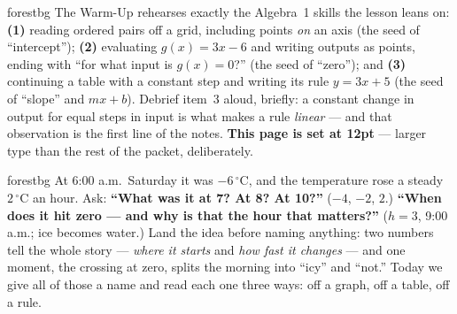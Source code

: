 \documentclass[10pt]{article}
\begin{document}
\begin{fixedskillbox}{forestbg}
    The Warm-Up rehearses exactly the Algebra~1 skills the lesson leans on: \textbf{(1)} reading
    ordered pairs off a grid, including points \emph{on} an axis (the seed of ``intercept'');
    \textbf{(2)} evaluating $g(x)=3x-6$ and writing outputs as points, ending with ``for what input is
    $g(x)=0$?'' (the seed of ``zero''); and \textbf{(3)} continuing a table with a constant step and
    writing its rule $y=3x+5$ (the seed of ``slope'' and $mx+b$). Debrief item~3 aloud, briefly: a
    constant change in output for equal steps in input is what makes a rule \emph{linear} --- and
    that observation is the first line of the notes. \textbf{This page is set at 12pt} --- larger
    type than the rest of the packet, deliberately.
\end{fixedskillbox}

\begin{skillbox}[Hook]{forestbg}
    At 6:00 a.m.\ Saturday it was $-6\,^\circ$C, and the temperature rose a steady $2\,^\circ$C an
    hour. Ask: \textbf{``What was it at 7? At 8? At 10?''} ($-4$, $-2$, $2$.) \textbf{``When does it
    hit zero --- and why is that the hour that matters?''} ($h=3$, 9:00 a.m.; ice becomes water.)
    Land the idea before naming anything: two numbers tell the whole story --- \emph{where it
    starts} and \emph{how fast it changes} --- and one moment, the crossing at zero, splits the
    morning into ``icy'' and ``not.'' Today we give all of those a name and read each one three ways:
    off a graph, off a table, off a rule.
\end{skillbox}
\end{document}
